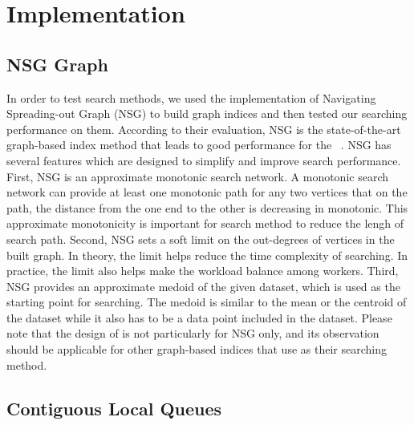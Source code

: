 \section{Implementation}\label{sec:implementation}

\subsection{NSG Graph}

In order to test search methods, we used the implementation of Navigating Spreading-out Graph (NSG) to build graph indices and then tested our searching performance on them. According to their evaluation, NSG is the state-of-the-art graph-based index method that leads to good performance for the \SeqFullName~\cite{fu2019fast}.
NSG has several features which are designed to simplify and improve search performance.
First, NSG is an approximate monotonic search network. A monotonic search network can provide at least one monotonic path for any two vertices that on the path, the distance from the one end to the other is decreasing in monotonic. This approximate monotonicity is important for search method to reduce the lengh of search path.
Second, NSG sets a soft limit on the out-degrees of vertices in the built graph. In theory, the limit helps reduce the time complexity of searching. In practice, the limit also helps make the workload balance among workers.
Third, NSG provides an approximate medoid of the given dataset, which is used as the starting point for searching. The medoid is similar to the mean or the centroid of the dataset while it also has to be a data point included in the dataset. Please note that the design of \FullName is not particularly for NSG only, and its observation should be applicable for other graph-based indices that use \SeqFullName as their searching method.


\subsection{Contiguous Local Queues}

